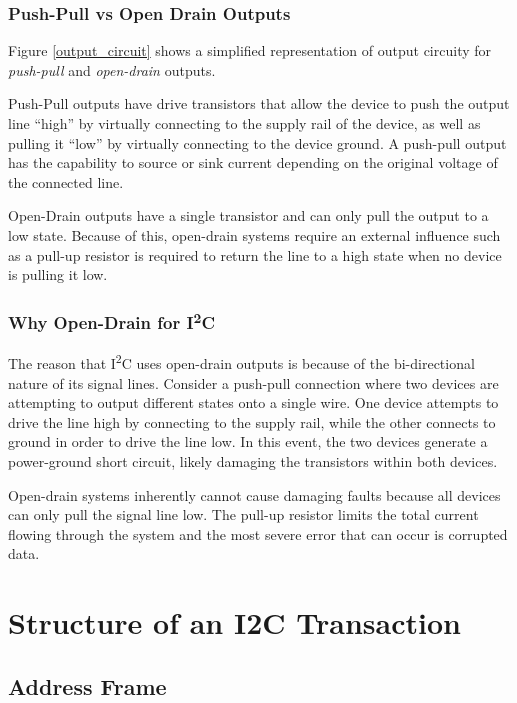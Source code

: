\documentclass[11pt,fleqn]{book} %
\begin{document}
        \subsubsection{Push-Pull vs Open Drain Outputs}
        Figure \ref{output_circuit} shows a simplified representation of output circuity for \textit{push-pull} and \textit{open-drain} outputs. 
        
        Push-Pull outputs have drive transistors that allow the device to push the output line ``high'' by virtually connecting to the supply rail of the device, as well as pulling it ``low'' by virtually connecting to the device ground. A push-pull output has the capability to source or sink current depending on the original voltage of the connected line. 
        
        Open-Drain outputs have a single transistor and can only pull the output to a low state. Because of this, open-drain systems require an external influence such as a pull-up resistor is required to return the line to a high state when no device is pulling it low. 
        
        \subsubsection{Why Open-Drain for I\textsuperscript{2}C}
            The reason that I\textsuperscript{2}C uses open-drain outputs is because of the bi-directional nature of its signal lines. Consider a push-pull connection where two devices are attempting to output different states onto a single wire. One device attempts to drive the line high by connecting to the supply rail, while the other connects to ground in order to drive the line low. In this event, the two devices generate a power-ground short circuit, likely damaging the transistors within both devices. 
            
            Open-drain systems inherently cannot cause damaging faults because all devices can only pull the signal line low. The pull-up resistor limits the total current flowing through the system and the most severe error that can occur is corrupted data. 

\section{Structure of an I2C Transaction}	
    \subsection{Address Frame}
\end{document}
